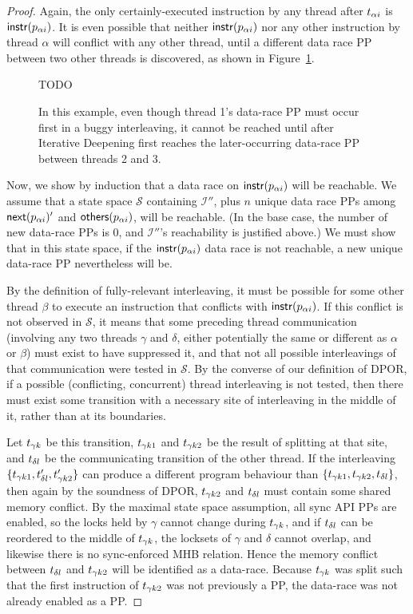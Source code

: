 \begin{proof}
Again, the only certainly-executed instruction by any thread after $t_{\alpha{}i}$ is $\mathsf{instr}(p_{\alpha{}i})$.
It is even possible that neither $\mathsf{instr}(p_{\alpha{}i})$ nor any other instruction by thread $\alpha$ will conflict with any other thread,
until a different data race PP between two other threads is discovered,
as shown in Figure~\ref{fig:threethreads}.

\begin{figure}[t]
	TODO %
	\caption{In this example, even though thread 1's data-race PP must occur first in a buggy interleaving, it cannot be reached until after Iterative Deepening first reaches the later-occurring data-race PP between threads 2 and 3.}
	\label{fig:threethreads}
\end{figure}

Now, we show by induction that a data race on $\mathsf{instr}(p_{\alpha{}i})$ will be reachable.
We assume that a state space $\mathcal{S}$ containing $\mathcal{I}''$,
plus $n$ unique data race PPs among $\mathsf{next}(p_{\alpha{}i})'$ and $\mathsf{others}(p_{\alpha{}i})$,
will be reachable.
(In the base case, the number of new data-race PPs is 0, and $\mathcal{I}''$'s reachability is justified above.)
We must show that in this state space, if the $\mathsf{instr}(p_{\alpha{}i})$ data race is not reachable,
a new unique data-race PP nevertheless will be.

By the definition of fully-relevant interleaving, it must be possible for some other thread $\beta$ to execute an instruction that conflicts with $\mathsf{instr}(p_{\alpha{}i})$.
%
If this conflict is not observed in $\mathcal{S}$,
it means that some preceding thread communication (involving any two threads $\gamma$ and $\delta$, either potentially the same or different as $\alpha$ or $\beta$) must exist to have suppressed it,
and that not all possible interleavings of that communication were tested in $\mathcal{S}$.
%
By the converse of our definition of DPOR, if a possible (conflicting, concurrent) thread interleaving is not tested,
then there must exist some transition with a necessary site of interleaving in the middle of it, rather than at its boundaries.

Let $t_{\gamma{}k}$ be this transition, $t_{\gamma{}k1}$ and $t_{\gamma{}k2}$ be the result of splitting at that site, and $t_{\delta{}l}$ be the communicating transition of the other thread.
%
If the interleaving $\{t_{\gamma{}k1}, t_{\delta{}l}', t_{\gamma{}k2}'\}$ can produce a different program behaviour than $\{t_{\gamma{}k1}, t_{\gamma{}k2}, t_{\delta{}l}\}$,
then again by the soundness of DPOR, $t_{\gamma{}k2}$ and $t_{\delta{}l}$ must contain some shared memory conflict.
By the maximal state space assumption, all sync API PPs are enabled, so the locks held by $\gamma$ cannot change during $t_{\gamma{}k}$,
and if $t_{\delta{}l}$ can be reordered to the middle of $t_{\gamma{}k}$, the locksets of $\gamma$ and $\delta$ cannot overlap,
and likewise there is no sync-enforced MHB relation.
Hence the memory conflict between $t_{\delta{}l}$ and $t_{\gamma{}k2}$ will be identified as a data-race.
Because $t_{\gamma{}k}$ was split such that the first instruction of $t_{\gamma{}k2}$ was not previously a PP, the data-race was not already enabled as a PP.


\end{proof}
